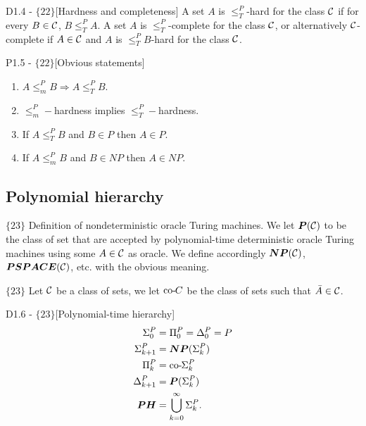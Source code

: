 \documentclass{article}
\begin{document}
\begin{flexidefinition}{D1.4 - $\{22\}$}[Hardness and completeness]
    A set $A$ is $\leq_T^P$-hard for the class $\mathcal{C}$ if for every $B \in \mathcal{C}$, $B \leq_T^P A$. A set $A$ is $\leq_T^P$-complete for the class $\mathcal{C}$, or alternatively $\mathcal{C}$-complete if $A \in \mathcal{C}$ and $A$ is $\leq_T^P B$-hard for the class $\mathcal{C}$. 
\end{flexidefinition} 

\begin{flexilemma}{P1.5 - $\{22\}$}[Obvious statements]
    \begin{enumerate}[label=(\alph*)]
        \item $A \leq_m^P B \Rightarrow A \leq_T^P B$.
        \item $\leq_m^P-$hardness implies $\leq_T^P-$hardness.
        \item If $A \leq_T^P B$ and $B \in P$ then $A \in P$.
        \item If $A \leq_m^P B$ and $B \in NP$ then $A \in NP$.
    \end{enumerate}
\end{flexilemma}

\subsection{Polynomial hierarchy}

$\{23\}$ Definition of nondeterministic oracle Turing machines. We let $\boldsymbol{P}(\mathcal{C})$ to be the class of set that are accepted by polynomial-time deterministic oracle Turing machines using some $A \in \mathcal{C}$ as oracle. We define accordingly $\boldsymbol{NP}(\mathcal{C})$, $\boldsymbol{PSPACE}(\mathcal{C})$, etc. with the obvious meaning.

$\{23\}$ Let $\mathcal{C}$ be a class of sets, we let ${\bf \operatorname{co-}\hspace{-0.25mm}} C$ be the class of sets such that $\bar A \in \mathcal{C}$.

\begin{flexidefinition}{D1.6 - $\{23\}$}[Polynomial-time hierarchy]
    \begin{align}
        \Sigma_0^P &= \Pi_0^P = \Delta_0^P = P\\
        \Sigma_{k+1}^P &= \boldsymbol{NP}(\Sigma_k^P)\\
        \Pi_{k}^P &= {\bf \operatorname{co-}\hspace{-0.25mm}} \Sigma_{k}^P\\
        \Delta_{k+1}^P &= \boldsymbol{P}(\Sigma_k^P)\\
        \boldsymbol{PH} &= \bigcup_{k=0}^\infty \Sigma_k^P.
    \end{align}
\end{flexidefinition}
\end{document}
